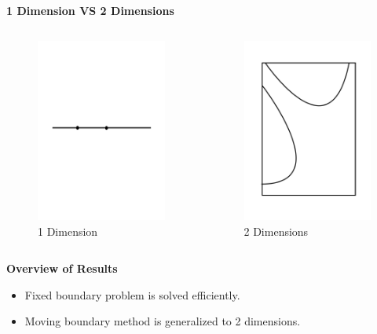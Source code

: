 \documentclass{beamer}
\begin{document}
\begin{frame}
{\bf 1 Dimension VS 2 Dimensions}
\begin{columns}

   \begin{figure}[hbt]
   \includegraphics[width = 5cm]{1D.pdf}
   \caption{1 Dimension}
   \end{figure}
 
  \begin{figure}[hbt]
  \includegraphics[width = 5cm]{2D1.pdf}
  \caption{2 Dimensions}
  \end{figure}
\end{columns}

\end{frame}



\begin{frame}
{\bf Overview of Results}
\begin{itemize}
  \item Fixed boundary problem is solved efficiently. 
  \item Moving boundary method is generalized to 2 dimensions.
\end{itemize}

\end{frame}
\end{document}
